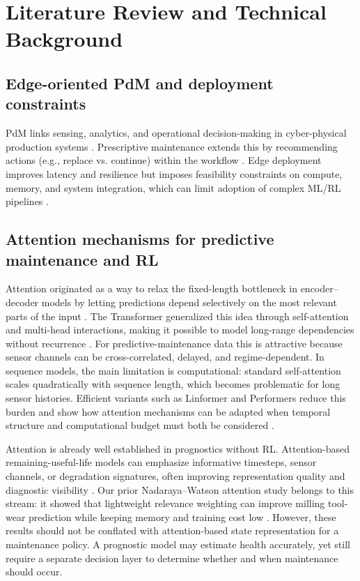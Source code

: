 \documentclass[sn-basic]{sn-jnl}%
\begin{document}
\section{Literature Review and Technical Background}
\label{sec:lit_tech}
\subsection{Edge-oriented PdM and deployment constraints}
PdM links sensing, analytics, and operational decision-making in cyber-physical production systems \cite{Compare2020, Zonta2020}. Prescriptive maintenance extends this by recommending actions (e.g., replace vs. continue) within the workflow \cite{Ansari2019}. Edge deployment improves latency and resilience but imposes feasibility constraints on compute, memory, and system integration, which can limit adoption of complex ML/RL pipelines \cite{Njor2024, Pandey2023}.

\subsection{Attention mechanisms for predictive maintenance and RL}
Attention originated as a way to relax the fixed-length bottleneck in encoder--decoder models by letting predictions depend selectively on the most relevant parts of the input \cite{Bahdanau2014, Luong2015}. The Transformer generalized this idea through self-attention and multi-head interactions, making it possible to model long-range dependencies without recurrence \cite{Vaswani2017}. For predictive-maintenance data this is attractive because sensor channels can be cross-correlated, delayed, and regime-dependent. In sequence models, the main limitation is computational: standard self-attention scales quadratically with sequence length, which becomes problematic for long sensor histories. Efficient variants such as Linformer and Performers reduce this burden and show how attention mechanisms can be adapted when temporal structure and computational budget must both be considered \cite{Wang2020Linformer, Choromanski2020}.

Attention is already well established in prognostics without RL. Attention-based remaining-useful-life models can emphasize informative timesteps, sensor channels, or degradation signatures, often improving representation quality and diagnostic visibility \cite{Chen2020, Chen2021, Costa2023}. Our prior Nadaraya--Watson attention study belongs to this stream: it showed that lightweight relevance weighting can improve milling tool-wear prediction while keeping memory and training cost low \cite{Siraskar2024}. However, these results should not be conflated with attention-based state representation for a maintenance policy. A prognostic model may estimate health accurately, yet still require a separate decision layer to determine whether and when maintenance should occur.
\end{document}
